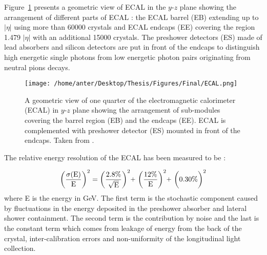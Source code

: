 Figure~\ref{fig:ecal} presents a geometric view of ECAL in the $y$-$z$ plane showing the arrangement of different parts of ECAL 
: the ECAL barrel (EB) extending up to $|\eta|$  using more than 60000 crystals and ECAL endcaps (EE) covering the region 1.479 \ls $|\eta|$  with an additional 15000 crystals. The preshower detectors (ES) made of lead absorbers and silicon detectors are put in front of the endcaps to distinguish high energetic single photons from low energetic photon pairs originating from neutral pions decays.

\begin{figure}[!h]
\begin{center}
\vspace*{3mm} 
\hspace*{-5mm}
\texttt{[image: /home/anter/Desktop/Thesis/Figures/Final/ECAL.png]}\\
\vspace*{2mm}
\caption[A geometric view of one quarter of the electromagnetic calorimeter (ECAL) in $y$-$z$ plane.]{A geometric view of one quarter of the electromagnetic calorimeter (ECAL) in $y$-$z$ plane showing the arrangement of sub-modules covering the barrel region (EB) and the endcaps (EE). ECAL is complemented with preshower detector (ES) mounted in front of the endcaps. Taken from \cite{Bayatian:2006nff}.}
\label{fig:ecal}
\end{center}
\end{figure}

The relative energy resolution of the ECAL has been measured to be \cite{Adzic:2007mi} :

\begin{equation}
{\rm \bigg(\frac{\sigma(E)}{E}\bigg)^2 = \bigg(\frac{2.8\%}{\sqrt{E}}\bigg)^2 \plus \bigg(\frac{12\%}{E}\bigg)^2 \plus \bigg(0.30\%\bigg)^2}
\end{equation}
where E is the energy in GeV. The first term is the stochastic component caused by fluctuations in the energy deposited in the preshower absorber and lateral shower containment. The second term is the contribution by noise and the last is the constant term which comes from leakage of energy from the back of the crystal, inter-calibration errors and non-uniformity of the longitudinal light collection. 

